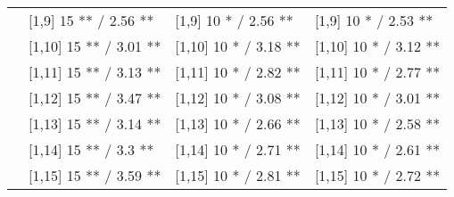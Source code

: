 \begin{table}
\begin{tabular}[t]{llll}
 & {}[1,9] 15 ** / 2.56 ** & {}[1,9] 10 * / 2.56 ** & {}[1,9] 10 * / 2.53 **\\
 & {}[1,10] 15 ** / 3.01 ** & {}[1,10] 10 * / 3.18 ** & {}[1,10] 10 * / 3.12 **\\
 & {}[1,11] 15 ** / 3.13 ** & {}[1,11] 10 * / 2.82 ** & {}[1,11] 10 * / 2.77 **\\
 & {}[1,12] 15 ** / 3.47 ** & {}[1,12] 10 * / 3.08 ** & {}[1,12] 10 * / 3.01 **\\
\addlinespace
 & {}[1,13] 15 ** / 3.14 ** & {}[1,13] 10 * / 2.66 ** & {}[1,13] 10 * / 2.58 **\\
 & {}[1,14] 15 ** / 3.3 ** & {}[1,14] 10 * / 2.71 ** & {}[1,14] 10 * / 2.61 **\\
 & {}[1,15] 15 ** / 3.59 ** & {}[1,15] 10 * / 2.81 ** & {}[1,15] 10 * / 2.72 **\\
\bottomrule
\end{tabular}
\end{table}
